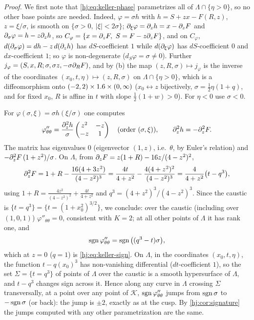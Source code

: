 \emph{Proof.} We first note that \eqref{hj:eq:keller-phase} parametrizes all of
$\Lambda\cap\{\eta>0\}$, so no other base points are needed. Indeed, $\varphi=\sigma h$ with
$h=S+zx-F(R,z)$, $z=\xi/\sigma$, is smooth on $\{\sigma>0,\ |\xi|<2\sigma\}$; $\partial_\xi\varphi
=\partial_zh=x-\partial_zF$ and $\partial_\sigma\varphi=h-z\partial_zh$, so $C_\varphi=\{x=\partial_zF,\ S=F-z\partial_zF\}$,
and on $C_\varphi$, $d(\partial_\sigma\varphi)=dh-z\,d(\partial_zh)$ has $dS$-coefficient $1$ while
$d(\partial_\xi\varphi)$ has $dS$-coefficient $0$ and $dx$-coefficient $1$; so $\varphi$ is
non-degenerate ($d_S\varphi=\sigma\ne0$). Further $j_\varphi=(S,x,R;\sigma,\sigma z,-\sigma\partial_R
F)$, and by (b) the map $(z,R,\sigma)\mapsto j_\varphi$ is the inverse of the coordinates
$(x_0,t,\eta)\mapsto(z,R,\sigma)$ on $\Lambda\cap\{\eta>0\}$, which is a diffeomorphism onto
$(-2,2)\times1.6\times(0,\infty)$ ($x_0\leftrightarrow z$ bijectively, $\sigma=\frac12\eta(1+q)$,
and for fixed $x_0$, $R$ is affine in $t$ with slope $\frac12(1+w)>0$). For $\eta<0$ use
$\sigma<0$.

For $\varphi(\sigma,\xi)=\sigma h(\xi/\sigma)$ one computes
\begin{equation*}
\varphi''_{\theta\theta}=\frac{\partial_z^2h}\sigma\begin{pmatrix}z^2&-z\\-z&1\end{pmatrix}
\quad\text{(order }(\sigma,\xi)),\qquad\partial_z^2h=-\partial_z^2F .
\end{equation*}
The matrix has eigenvalues $0$ (eigenvector $(1,z)$, i.e.\ $\theta$, by Euler's relation) and
$-\partial_z^2F\,(1+z^2)/\sigma$. On $\Lambda$, from $\partial_zF=z(1+R)-16z/(4-z^2)^2$,
\begin{equation*}
\partial_z^2F=1+R-\frac{16(4+3z^2)}{(4-z^2)^3}=\frac{4t}{4+z^2}-\frac{4(4+z^2)^2}{(4-z^2)^3}
=\frac4{4+z^2}\big(t-q^3\big),
\end{equation*}
using $1+R=\frac{4z^2}{(4-z^2)^2}+\frac{4t}{4+z^2}$ and $q^3=(4+z^2)^3/(4-z^2)^3$. Since the
caustic is $\{t=q^3\}=\{t=(1+x_0^2)^{3/2}\}$, we conclude: over the caustic (including over
$(1,0,1)$) $\varphi''_{\theta\theta}=0$, consistent with $K=2$; at all other points of $\Lambda$
it has rank one, and
\begin{equation*}
\operatorname{sgn}\varphi''_{\theta\theta}=\operatorname{sgn}\big((q^3-t)\sigma\big),
\end{equation*}
which at $z=0$ ($q=1$) is \eqref{hj:eq:keller-sign}. On $\Lambda$, in the coordinates
$(x_0,t,\eta)$, the function $t-q(x_0)^3$ has non-vanishing differential ($dt$-coefficient $1$),
so the set $\Sigma=\{t=q^3\}$ of points of $\Lambda$ over the caustic is a smooth hypersurface
of $\Lambda$, and $t-q^3$ changes sign across it. Hence along any curve in $\Lambda$ crossing
$\Sigma$ transversally, at a point over any point of $\mathcal K$, $\operatorname{sgn}\varphi''_{\theta\theta}$
jumps from $\operatorname{sgn}\sigma$ to $-\operatorname{sgn}\sigma$ (or back): the jump is $\pm2$, exactly as at the cusp.
By \cref{hj:cor:signature} the jumps computed with any other parametrization are the same.

